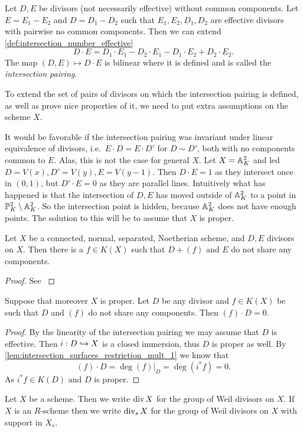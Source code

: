 \begin{definition}
	Let $D, E$ be divisors (not necessarily effective) without common components. 
	Let $E = E_1 - E_2$ and $D = D_1 - D_2$ such that $E_1, E_2, D_1, D_2$ are effective divisors with pairwise no common components. 
	Then we can extend \cref{def:intersection_number_effective} 
	\[
	D\cdot E = D_1 \cdot E_1 - D_2 \cdot E_1 - D_1 \cdot E_2 + D_2 \cdot  E_2
	.\] 
	The map $(D, E )\mapsto D\cdot E$ is bilinear where it is defined and is called the \emph{intersection pairing}.
\end{definition}

To extend the set of pairs of divisors on which the intersection pairing is defined, as well as prove nice properties of it, we need to put extra assumptions on the scheme $X$. 
\begin{example}\label{ex:fail_intersection_pairing_linear}
	It would be favorable if the intersection pairing was invariant under linear equivalence of divisors, i.e.\ $E\cdot D = E\cdot D'$ for $D \sim D'$, both with no components common to $E$. 
	Alas, this is not the case for general $X$. 
	Let $X = \mathbb{A}_K^{2}$ and led $D = V(x), D' = V(y), E = V(y-1)$. 
	Then $D\cdot E = 1$ as they intersect once in $(0, 1)$, but $D' \cdot E = 0$ as they are parallel lines. 
	Intuitively what has happened is that the intersection of $D, E$ has moved outside of $\mathbb{A}_K^2$ to a point in $\mathbb{P}^{2}_K \setminus \mathbb{A}_{K}^2$. 
	So the intersection point is hidden, because $\mathbb{A}_K^2$ does not have enough points. 
	The solution to this will be to assume that $X$ is proper. 
\end{example}


\begin{lemma}\label{lem:moving_lemma}
	Let $X$ be a connected, normal, separated, Noetherian scheme, and $D, E$ divisors on $X$. 
	Then there is a $f \in K(X)$ such that $D + (f)$ and $E$ do not share any components. 
\end{lemma}
\begin{proof}
	See \cite[cor.\ 9.1.10]{liuAlgebraicGeometryArithmetic2002}
\end{proof}

\begin{lemma}\label{lem:proper_trivial_bundle_pairing}
	Suppose that moreover $X$ is proper. 
	Let  $D$ be any divisor and $f \in K(X)$ be such that $D$ and $(f)$ do not share any components. 
	Then $(f)\cdot D = 0$. 
\end{lemma}
\begin{proof}
	By the linearity of the intersection pairing we may assume that $D$ is effective. 
	Then $ i: D \hookrightarrow X$ is a closed immersion, thus $D$ is proper as well. By \cref{lem:intersection_surfaces_restriction_mult_1} we know that \[
		(f)\cdot D = \deg (f)|_D = \deg (i^* f) = 0
	.\] 
	As $i^* f \in K(D)$ and $D$ is proper. 
\end{proof}
\begin{definition}
	Let $X$ be a scheme. Then we write $\operatorname{div} X$ for the group of Weil divisors on $X$.
	If  $X$ is an $R$-scheme then we write $\operatorname{div}_s X$ for the group of Weil divisors on $X$ with support in $X_s$. 
\end{definition}

